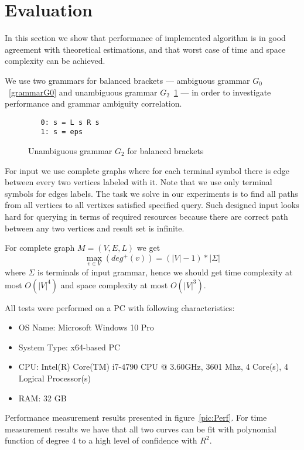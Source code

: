 \section{Evaluation}

In this section we show that performance of implemented algorithm is in good agreement with theoretical estimations, and that worst case of time and space complexity can be achieved.  

We use two grammars for balanced brackets --- ambiguous grammar $G_0$~\ref{grammarG0} and unambiguous grammar $G_2$~\ref{grammarG2} --- in order to investigate performance and grammar ambiguity correlation.

\begin{figure}[ht]
   \begin{center}
\begin{verbatim}
   0: s = L s R s 
   1: s = eps
\end{verbatim}
   \caption{Unambiguous grammar $G_2$ for balanced brackets}
   \label{grammarG2}        
   \end{center}
\end{figure}

For input we use complete graphs where for each terminal symbol there is edge between every two vertices labeled with it.
Note that we use only terminal symbols for edges labels.  
The task we solve in our experiments is to find all paths from all vertices to all vertixes satisfied specified query.
Such designed input looks hard for querying in terms of required resources because there are correct path between any two vertices and result set is infinite.

For complete graph $M=(V,E,L)$ we get $$\max\limits_{v \in V}\left(deg^+\left(v\right)\right) = (|V| - 1)*|\Sigma|$$ where $\Sigma$ is terminals of input grammar, hence we should get time complexity at most $O(|V|^4)$ and space complexity at most $O(|V|^3)$.

All tests were performed on a PC with following characteristics:
\begin{itemize}
\item OS Name: Microsoft Windows 10 Pro
\item System Type: x64-based PC
\item CPU: Intel(R) Core(TM) i7-4790 CPU @ 3.60GHz, 3601 Mhz, 4 Core(s), 4 Logical Processor(s)
\item RAM: 32 GB
\end{itemize}

Performance measurement results presented in figure~\ref{pic:Perf}. 
For time measurement results we have that all two curves can be fit with polynomial function of degree 4 to a high level of confidence with $R^2$. 

